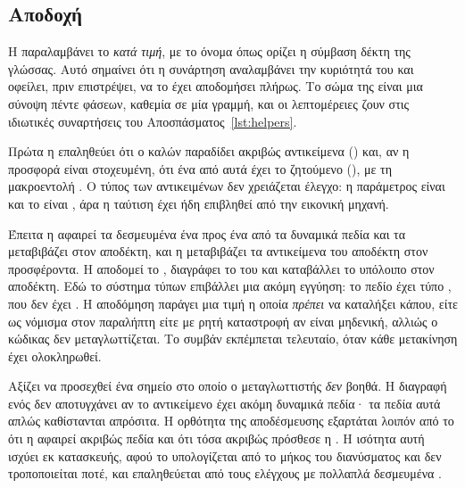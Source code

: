 \subsection{Αποδοχή}
\label{sec:accept-bid}



Η  παραλαμβάνει το  \emph{κατά τιμή}, με το όνομα 
όπως ορίζει η σύμβαση δέκτη της γλώσσας. Αυτό σημαίνει ότι η συνάρτηση αναλαμβάνει την
κυριότητά του και οφείλει, πριν επιστρέψει, να το έχει αποδομήσει πλήρως. Το σώμα της είναι
μια σύνοψη πέντε φάσεων, καθεμία σε μία γραμμή, και οι λεπτομέρειες ζουν στις ιδιωτικές
συναρτήσεις του Αποσπάσματος~\ref{lst:helpers}.



Πρώτα η  επαληθεύει ότι ο καλών παραδίδει ακριβώς
 αντικείμενα () και, αν η προσφορά είναι
στοχευμένη, ότι ένα από αυτά έχει το ζητούμενο  (), με
τη μακροεντολή . Ο τύπος των αντικειμένων δεν χρειάζεται έλεγχο: η παράμετρος
είναι  και το  είναι ,
άρα η ταύτιση έχει ήδη επιβληθεί από την εικονική μηχανή.

Έπειτα η  αφαιρεί τα δεσμευμένα  ένα προς ένα από τα
δυναμικά πεδία και τα μεταβιβάζει στον αποδέκτη, και η  μεταβιβάζει τα
αντικείμενα του αποδέκτη στον προσφέροντα. Η  αποδομεί το ,
διαγράφει το  του και καταβάλλει το υπόλοιπο  στον αποδέκτη. Εδώ το
σύστημα τύπων επιβάλλει μια ακόμη εγγύηση: το πεδίο  έχει τύπο
, που δεν έχει . Η αποδόμηση παράγει μια τιμή
 η οποία \emph{πρέπει} να καταλήξει κάπου, είτε ως νόμισμα στον παραλήπτη
είτε με ρητή καταστροφή αν είναι μηδενική, αλλιώς ο κώδικας δεν μεταγλωττίζεται. Το συμβάν
εκπέμπεται τελευταίο, όταν κάθε μετακίνηση έχει ολοκληρωθεί.

Αξίζει να προσεχθεί ένα σημείο στο οποίο ο μεταγλωττιστής \emph{δεν} βοηθά. Η διαγραφή
ενός  δεν αποτυγχάνει αν το αντικείμενο έχει ακόμη δυναμικά πεδία· τα πεδία
αυτά απλώς καθίστανται απρόσιτα. Η ορθότητα της αποδέσμευσης εξαρτάται λοιπόν από το ότι η
 αφαιρεί ακριβώς  πεδία και ότι τόσα ακριβώς
πρόσθεσε η . Η ισότητα αυτή ισχύει εκ κατασκευής, αφού το
 υπολογίζεται από το μήκος του διανύσματος και δεν τροποποιείται
ποτέ, και επαληθεύεται από τους ελέγχους με πολλαπλά δεσμευμένα .

